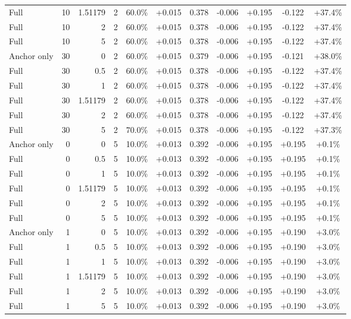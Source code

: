 \begin{table}[htbp]
\begin{tabular}{lrrrccccccc}
Full & 10 & 1.51179 & 2 & 60.0\% & +0.015 & 0.378 & -0.006 & +0.195 & -0.122 & +37.4\% \\
Full & 10 & 2 & 2 & 60.0\% & +0.015 & 0.378 & -0.006 & +0.195 & -0.122 & +37.4\% \\
Full & 10 & 5 & 2 & 60.0\% & +0.015 & 0.378 & -0.006 & +0.195 & -0.122 & +37.4\% \\
Anchor only & 30 & 0 & 2 & 60.0\% & +0.015 & 0.379 & -0.006 & +0.195 & -0.121 & +38.0\% \\
Full & 30 & 0.5 & 2 & 60.0\% & +0.015 & 0.378 & -0.006 & +0.195 & -0.122 & +37.4\% \\
Full & 30 & 1 & 2 & 60.0\% & +0.015 & 0.378 & -0.006 & +0.195 & -0.122 & +37.4\% \\
Full & 30 & 1.51179 & 2 & 60.0\% & +0.015 & 0.378 & -0.006 & +0.195 & -0.122 & +37.4\% \\
Full & 30 & 2 & 2 & 60.0\% & +0.015 & 0.378 & -0.006 & +0.195 & -0.122 & +37.4\% \\
Full & 30 & 5 & 2 & 70.0\% & +0.015 & 0.378 & -0.006 & +0.195 & -0.122 & +37.3\% \\
Anchor only & 0 & 0 & 5 & 10.0\% & +0.013 & 0.392 & -0.006 & +0.195 & +0.195 & +0.1\% \\
Full & 0 & 0.5 & 5 & 10.0\% & +0.013 & 0.392 & -0.006 & +0.195 & +0.195 & +0.1\% \\
Full & 0 & 1 & 5 & 10.0\% & +0.013 & 0.392 & -0.006 & +0.195 & +0.195 & +0.1\% \\
Full & 0 & 1.51179 & 5 & 10.0\% & +0.013 & 0.392 & -0.006 & +0.195 & +0.195 & +0.1\% \\
Full & 0 & 2 & 5 & 10.0\% & +0.013 & 0.392 & -0.006 & +0.195 & +0.195 & +0.1\% \\
Full & 0 & 5 & 5 & 10.0\% & +0.013 & 0.392 & -0.006 & +0.195 & +0.195 & +0.1\% \\
Anchor only & 1 & 0 & 5 & 10.0\% & +0.013 & 0.392 & -0.006 & +0.195 & +0.190 & +3.0\% \\
Full & 1 & 0.5 & 5 & 10.0\% & +0.013 & 0.392 & -0.006 & +0.195 & +0.190 & +3.0\% \\
Full & 1 & 1 & 5 & 10.0\% & +0.013 & 0.392 & -0.006 & +0.195 & +0.190 & +3.0\% \\
Full & 1 & 1.51179 & 5 & 10.0\% & +0.013 & 0.392 & -0.006 & +0.195 & +0.190 & +3.0\% \\
Full & 1 & 2 & 5 & 10.0\% & +0.013 & 0.392 & -0.006 & +0.195 & +0.190 & +3.0\% \\
Full & 1 & 5 & 5 & 10.0\% & +0.013 & 0.392 & -0.006 & +0.195 & +0.190 & +3.0\% \\

\end{tabular}
\end{table}
